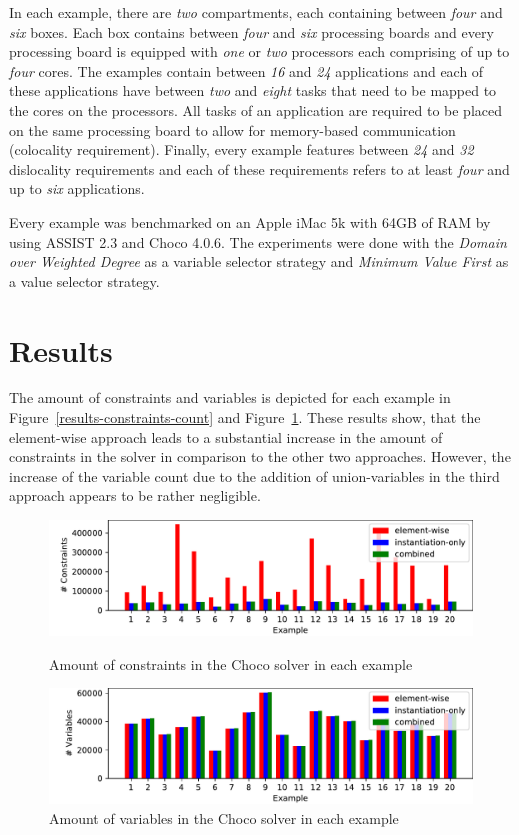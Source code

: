 \documentclass[english,biblatex]{lni}
\begin{document}
In each example, there are \emph{two} compartments, each containing between \emph{four} and \emph{six} boxes.
Each box contains between \emph{four} and \emph{six} processing boards and every processing board is equipped with \emph{one} or \emph{two} processors each comprising of up to \emph{four} cores.
The examples contain between \emph{16} and \emph{24} applications and each of these applications have between \emph{two} and \emph{eight} tasks that need to be mapped to the cores on the processors.
All tasks of an application are required to be placed on the same processing board to allow for memory-based communication (colocality requirement).
Finally, every example features between \emph{24} and \emph{32} dislocality requirements and each of these requirements refers to at least \emph{four} and up to \emph{six} applications.

Every example was benchmarked on an Apple iMac 5k with 64GB of RAM by using ASSIST 2.3 and Choco 4.0.6.
The experiments were done with the \emph{Domain over Weighted Degree} as a variable selector strategy and \emph{Minimum Value First} as a value selector strategy.

\section{Results}

The amount of constraints and variables is depicted for each example in Figure~\ref{results-constraints-count} and Figure~\ref{results-variables-count}.
These results show, that the element-wise approach leads to a substantial increase in the amount of constraints in the solver in comparison to the other two approaches.
However, the increase of the variable count due to the addition of union-variables in the third approach appears to be rather negligible.

\begin{figure}[h!tbp]
\centering
\includegraphics[width=\textwidth]{results-constraint-count}
\caption{Amount of constraints in the Choco solver in each example}
\label{results-constraints-count}
\vspace*{\floatsep}
\includegraphics[width=\textwidth]{results-variables-count}
\caption{Amount of variables in the Choco solver in each example}
\label{results-variables-count}
\end{figure}
\end{document}
